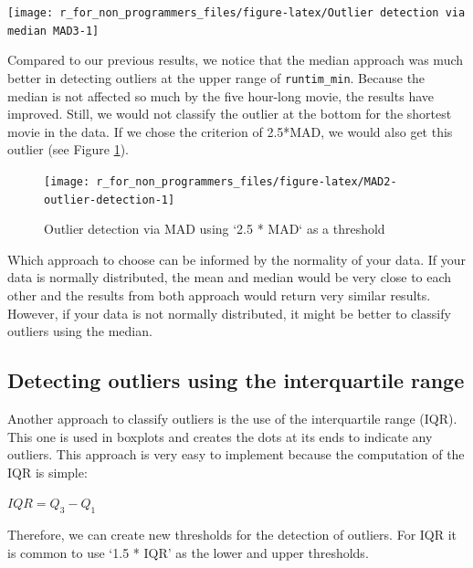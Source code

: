 \documentclass[
]{book}
\begin{document}
\begin{center}\texttt{[image: r\_for\_non\_programmers\_files/figure-latex/Outlier detection via median MAD3-1]} \end{center}

Compared to our previous results, we notice that the median approach was much better in detecting outliers at the upper range of \texttt{runtim\_min}. Because the median is not affected so much by the five hour-long movie, the results have improved. Still, we would not classify the outlier at the bottom for the shortest movie in the data. If we chose the criterion of 2.5*MAD, we would also get this outlier (see Figure \ref{fig:MAD2-outlier-detection}).

\begin{figure}

{\centering \texttt{[image: r\_for\_non\_programmers\_files/figure-latex/MAD2-outlier-detection-1]} 

}

\caption{Outlier detection via MAD using `2.5 * MAD` as a threshold}\label{fig:MAD2-outlier-detection}
\end{figure}

Which approach to choose can be informed by the normality of your data. If your data is normally distributed, the mean and median would be very close to each other and the results from both approach would return very similar results. However, if your data is not normally distributed, it might be better to classify outliers using the median.

\hypertarget{outliers-iqr}{%
\subsection{Detecting outliers using the interquartile range}\label{outliers-iqr}}

Another approach to classify outliers is the use of the interquartile range (IQR). This one is used in boxplots and creates the dots at its ends to indicate any outliers. This approach is very easy to implement because the computation of the IQR is simple:

\leavevmode\hypertarget{iqr-formula}{}%
\(IQR = Q_{3}-Q_{1}\)

Therefore, we can create new thresholds for the detection of outliers. For IQR it is common to use `1.5 * IQR' as the lower and upper thresholds.
\end{document}
